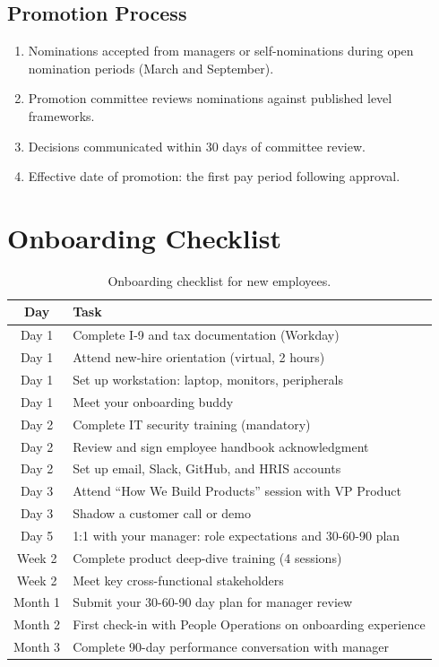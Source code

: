 \documentclass[
    language=english,
    doctype=employee-handbook,
    institution=none,
]{../../omnilatex}
\begin{document}
\subsection{Promotion Process}

\begin{enumerate}
    \item Nominations accepted from managers or self-nominations during
          open nomination periods (March and September).
    \item Promotion committee reviews nominations against published level
          frameworks.
    \item Decisions communicated within 30 days of committee review.
    \item Effective date of promotion: the first pay period following
          approval.
\end{enumerate}

\section{Onboarding Checklist}

\begin{table}[h]
    \centering
    \begin{tabular}{cl}
        \toprule
        \textbf{Day} & \textbf{Task} \\
        \midrule
        Day 1 & Complete I-9 and tax documentation (Workday) \\
        Day 1 & Attend new-hire orientation (virtual, 2 hours) \\
        Day 1 & Set up workstation: laptop, monitors, peripherals \\
        Day 1 & Meet your onboarding buddy \\
        Day 2 & Complete IT security training (mandatory) \\
        Day 2 & Review and sign employee handbook acknowledgment \\
        Day 2 & Set up email, Slack, GitHub, and HRIS accounts \\
        Day 3 & Attend ``How We Build Products'' session with VP Product \\
        Day 3 & Shadow a customer call or demo \\
        Day 5 & 1:1 with your manager: role expectations and 30-60-90 plan \\
        Week 2 & Complete product deep-dive training (4 sessions) \\
        Week 2 & Meet key cross-functional stakeholders \\
        Month 1 & Submit your 30-60-90 day plan for manager review \\
        Month 2 & First check-in with People Operations on onboarding experience \\
        Month 3 & Complete 90-day performance conversation with manager \\
        \bottomrule
    \end{tabular}
    \caption{Onboarding checklist for new employees.}
\end{table}
\end{document}
